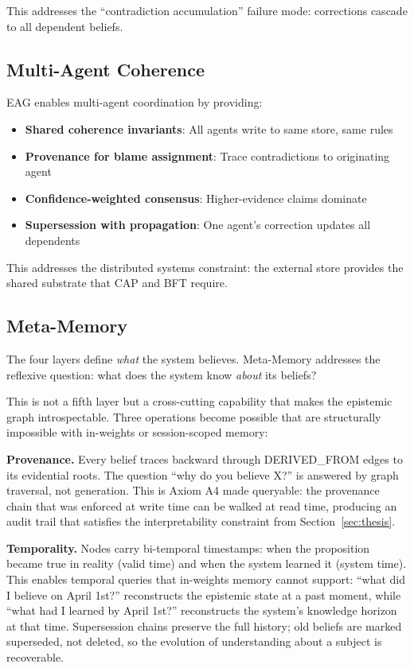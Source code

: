 \documentclass[11pt,letterpaper]{article}
\begin{document}
This addresses the ``contradiction accumulation'' failure mode: corrections cascade to all dependent beliefs.

\subsection{Multi-Agent Coherence}

EAG enables multi-agent coordination by providing:

\begin{itemize}[noitemsep]
    \item \textbf{Shared coherence invariants}: All agents write to same store, same rules
    \item \textbf{Provenance for blame assignment}: Trace contradictions to originating agent
    \item \textbf{Confidence-weighted consensus}: Higher-evidence claims dominate
    \item \textbf{Supersession with propagation}: One agent's correction updates all dependents
\end{itemize}

This addresses the distributed systems constraint: the external store provides the shared substrate that CAP and BFT require.

\subsection{Meta-Memory}

The four layers define \textit{what} the system believes. Meta-Memory addresses the reflexive question: what does the system know \textit{about} its beliefs?

This is not a fifth layer but a cross-cutting capability that makes the epistemic graph introspectable. Three operations become possible that are structurally impossible with in-weights or session-scoped memory:

\textbf{Provenance.} Every belief traces backward through DERIVED\_FROM edges to its evidential roots. The question ``why do you believe X?'' is answered by graph traversal, not generation. This is Axiom A4 made queryable: the provenance chain that was enforced at write time can be walked at read time, producing an audit trail that satisfies the interpretability constraint from Section~\ref{sec:thesis}.

\textbf{Temporality.} Nodes carry bi-temporal timestamps: when the proposition became true in reality (valid time) and when the system learned it (system time). This enables temporal queries that in-weights memory cannot support: ``what did I believe on April 1st?'' reconstructs the epistemic state at a past moment, while ``what had I learned by April 1st?'' reconstructs the system's knowledge horizon at that time. Supersession chains preserve the full history; old beliefs are marked superseded, not deleted, so the evolution of understanding about a subject is recoverable.
\end{document}
